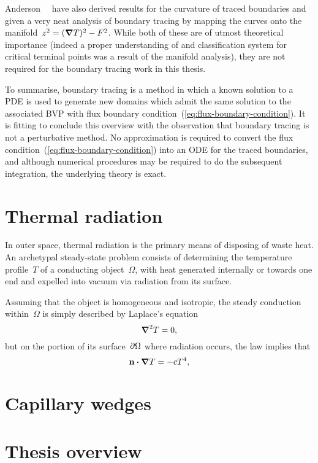 Anderson~\etal~\cite{anderson-2007-boundary-tracing-i-theory}
have also derived results for the curvature of traced boundaries
and given a very neat analysis of boundary tracing
by mapping the curves onto the manifold~$z^2 = (\mathop{}\!\boldsymbol{\mathrm{\nabla}} T)^2 - F^2$.
While both of these are of utmost theoretical importance
(indeed a proper understanding of and classification system for
critical terminal points was a result of the manifold analysis),
they are not required for the boundary tracing work in this thesis.

To summarise, boundary tracing is a method in which
a known solution to a PDE is used
to generate new domains which admit the same solution
to the associated BVP
with flux boundary condition~(\ref{eq:flux-boundary-condition}).
It is fitting to conclude this overview with the observation that
boundary tracing is not a perturbative method.
No approximation is required
to convert the flux condition~(\ref{eq:flux-boundary-condition})
into an ODE for the traced boundaries,
and although numerical procedures may be required
to do the subsequent integration,
the underlying theory is exact.

\section{Thermal radiation}
\label{sec:introduction.radiation}

In outer space,
thermal radiation is the primary means of disposing of waste heat.
An archetypal steady-state problem consists of
determining the temperature profile~$T$ of a conducting object~$\Omega$,
with heat generated internally or towards one end
and expelled into vacuum via radiation from its surface.

Assuming that the object is homogeneous and isotropic,
the steady conduction within~$\Omega$
is simply described by Laplace's equation
\begin{equation}
  \mathop{}\!\boldsymbol{\mathrm{\nabla}}^2 T = 0,
  \label{eq:laplace-steady-conduction}
\end{equation}
but on the portion of its surface~$\mathop{}\!\partial \Omega$ where radiation occurs,
the \stefanboltz{} law implies that
\begin{equation}
  \mathop{}\!\boldsymbol{\mathrm{n}} \boldsymbol{\cdot} \mathop{}\!\boldsymbol{\mathrm{\nabla}} T = - c T^4,
  \label{eq:radiation-boundary-condition}
\end{equation}

\section{Capillary wedges}

\section{Thesis overview}
